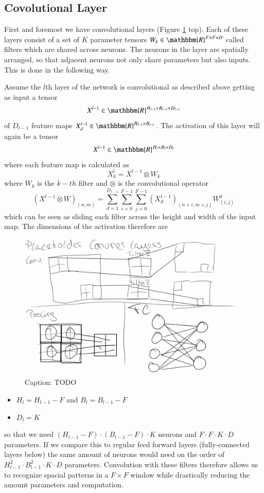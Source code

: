 \documentclass[preprint,12pt,3p]{elsarticle}
\begin{document}
\subsection{Covolutional Layer}
First and foremost we have convolutional layers (Figure \ref{fig:layers} top). Each of these layers consist of a set of $K$ parameter tensors $W_k\in\mathbbm{R}^{F\times F\times D}$ called filters which are shared across neurons. The neurons in the layer are spatially arranged, so that adjacent neurons not only share parameters but also inputs. This is done in the following way. 

Assume the $l$th layer of the network is convolutional as described above getting as input a tensor 
$$X^{l-1}\in\mathbbm{R}^{H_{l-1}\times B_{l-1}\times D_{l-1}}$$ 
of $D_{l-1}$ feature maps $X^{l-1}_d\in\mathbbm{R}^{H_{l-1}\times B_{l-1}}$. The activation of this layer will again be a tensor 
$$X^{l-1}\in\mathbbm{R}^{H_{l}\times B_{l}\times D_{l}}$$ 
where each feature map is calculated as
$$X^{l}_k=X^{l-1}\otimes W_k$$
where $W_k$ is the $k-th$ filter and $\otimes$ is the convolutional operator
$$(X^{l-1}\otimes W)_{(n,m)}=\sum_{d=1}^{D_{l-1}} \sum_{i=0}^{F-1} \sum_{j=0}^{F-1} (X^{l-1}_d)_{(n+i,m+j)}W^d_{(i,j)}$$
which can be seen as sliding each filter across the height and width of the input map. The dimensions of the activation therefore are 

\begin{figure}
    \centering
    \includegraphics[scale=0.5]{figures/layers.jpg}
    \caption{Caption: TODO}
    \label{fig:layers}
\end{figure}

\begin{itemize}
    \item $H_l=H_{l-1}-F$ and $B_l=B_{l-1}-F$
    \item $D_l=K$
\end{itemize}
so that we need $(H_{l-1}-F)\cdot(B_{l-1}-F)\cdot K$ neurons and $F\cdot F\cdot K\cdot D$ parameters. If we compare this to regular feed forward layers (fully-connected layers below) the same amount of neurons would need on the order of $H_{l-1}^2\cdot B_{l-1}^2\cdot K\cdot D$ parameters. Convolution with these filters therefore allows us to recognize spacial patterns in a $F\times F$ window while drastically reducing the amount parameters and computation. 
\end{document}

